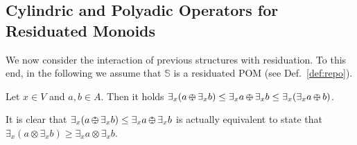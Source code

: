 \documentclass{llncs}
\def\monop{\otimes}
\def\odiv{\, {\ominus\hspace{-7.7pt} \div} \,}
\begin{document}


\subsection{Cylindric and Polyadic Operators for Residuated Monoids}
\label{cyre}
We now consider 
the interaction of previous structures with residuation. 
%
To this end, in the following we assume that 
$\mathbb{S}$ is a residuated POM (see Def.~\ref{def:repo}).


\begin{lemma}
\label{divex}
Let $x \in V$ and $a, b \in A$.
Then it holds
         $\exists_x(a \odiv \exists_x b) \leq \exists_x a \odiv \exists_x b \leq
                                               \exists_x(\exists_x a \odiv b)$.
\end{lemma}



\begin{remark}
\label{remdiv}
It is clear that $\exists_x(a \odiv \exists_x b) \leq \exists_x a \odiv \exists_x b$
is actually equivalent to state that
$\exists_x(a \monop \exists_x b) \geq \exists_x a \monop \exists_x b$.
\end{remark}
\end{document}
